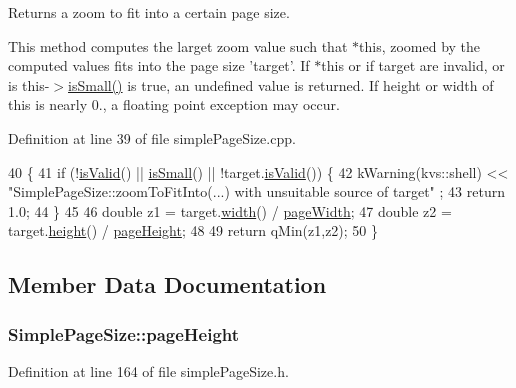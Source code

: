 Returns a zoom to fit into a certain page size. 

This method computes the larget zoom value such that $\ast$this, zoomed by the computed values fits into the page size 'target'. If $\ast$this or if target are invalid, or is this-\/$>$\hyperlink{classSimplePageSize_a593f0284c950b6a71bdce5c6751f30f4}{is\+Small()} is true, an undefined value is returned. If height or width of this is nearly 0., a floating point exception may occur. 

Definition at line 39 of file simple\+Page\+Size.\+cpp.


\begin{DoxyCode}
40 \{
41   \textcolor{keywordflow}{if} (!\hyperlink{classSimplePageSize_acc614937770417e54201cac058ed19be}{isValid}() || \hyperlink{classSimplePageSize_a593f0284c950b6a71bdce5c6751f30f4}{isSmall}() || !target.\hyperlink{classSimplePageSize_acc614937770417e54201cac058ed19be}{isValid}()) \{
42     kWarning(kvs::shell) << \textcolor{stringliteral}{"SimplePageSize::zoomToFitInto(...) with unsuitable source of target"} ;
43     \textcolor{keywordflow}{return} 1.0;
44   \}
45 
46   \textcolor{keywordtype}{double} z1 = target.\hyperlink{classSimplePageSize_a5866f4c04635b09ec065a1fc45f9d1df}{width}() / \hyperlink{classSimplePageSize_ad5aa26a1789bd7b20dbca509a50cfcab}{pageWidth};
47   \textcolor{keywordtype}{double} z2 = target.\hyperlink{classSimplePageSize_a8df6b43628bff9c8b53f26cc478640c5}{height}() / \hyperlink{classSimplePageSize_a0e0bc8a9833d9c276f96e6fda5c64cf7}{pageHeight};
48 
49   \textcolor{keywordflow}{return} qMin(z1,z2);
50 \}
\end{DoxyCode}


\subsection{Member Data Documentation}
\hypertarget{classSimplePageSize_a0e0bc8a9833d9c276f96e6fda5c64cf7}{
\subsubsection[{page\+Height}]{ Simple\+Page\+Size\+::page\+Height\hspace{0.3cm}{\ttfamily [protected]}}}\label{classSimplePageSize_a0e0bc8a9833d9c276f96e6fda5c64cf7}


Definition at line 164 of file simple\+Page\+Size.\+h.

